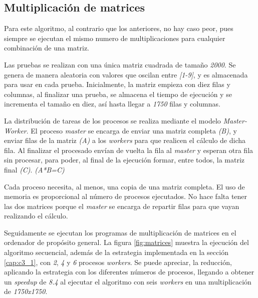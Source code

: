 		

	\subsection{Multiplicación de matrices}
		
		Para este algoritmo, al contrario que los anteriores, no hay caso peor, pues siempre se ejecutan el mismo numero de multiplicaciones para cualquier combinación de una matriz. 
		
		Las pruebas se realizan con una única matriz cuadrada de tamaño \textit{2000}. Se genera de manera aleatoria con valores que oscilan entre \textit{[1-9]}, y es almacenada para usar en cada prueba. Inicialmente, la matriz empieza con diez filas y columnas, al finalizar una prueba, se almacena el tiempo de ejecución y se incrementa el tamaño en diez, así hasta llegar a \textit{1750} filas y columnas. 
		
		La distribución de tareas de los procesos se realiza mediante el modelo \textit{Master-Worker}. El proceso \textit{master} se encarga de enviar una matriz completa \textit{(B)}, y enviar filas de la matriz \textit{(A)} a los \textit{workers} para que realicen el cálculo de dicha fila. Al finalizar el procesado envían de vuelta la fila al \textit{master} y esperan otra fila sin procesar, para poder, al final de la ejecución formar, entre todos, la matriz final \textit{(C)}. \textit{(A*B=C)}
	
		Cada proceso necesita, al menos, una copia de una matriz completa. El uso de memoria es proporcional al número de procesos ejecutados. No hace falta tener las dos matrices porque el \textit{master} se encarga de repartir filas para que vayan realizando el cálculo.
		
		\vspace*{0.2cm}
	
		Seguidamente se ejecutan los programas de multiplicación de matrices en el ordenador de propósito general. La figura \ref{fig:matrices} muestra la ejecución del algoritmo secuencial, además de la estrategia implementada en la sección \ref{cap:c3_1}, con \textit{2}, \textit{4} y \textit{6} procesos \textit{workers}. Se puede apreciar, la reducción, aplicando la estrategia con los diferentes números de procesos, llegando a obtener un \textit{speedup} de \textit{8.4} al ejecutar el algoritmo con seis \textit{workers} en una multiplicación de \textit{1750x1750}.
		
